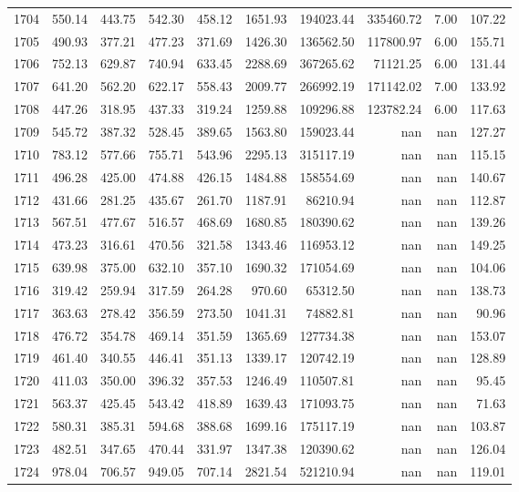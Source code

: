 \begin{tabular}{lrrrrrrrrr}
1704 & 550.14 & 443.75 & 542.30 & 458.12 & 1651.93 & 194023.44 & 335460.72 & 7.00 & 107.22 \\
1705 & 490.93 & 377.21 & 477.23 & 371.69 & 1426.30 & 136562.50 & 117800.97 & 6.00 & 155.71 \\
1706 & 752.13 & 629.87 & 740.94 & 633.45 & 2288.69 & 367265.62 & 71121.25 & 6.00 & 131.44 \\
1707 & 641.20 & 562.20 & 622.17 & 558.43 & 2009.77 & 266992.19 & 171142.02 & 7.00 & 133.92 \\
1708 & 447.26 & 318.95 & 437.33 & 319.24 & 1259.88 & 109296.88 & 123782.24 & 6.00 & 117.63 \\
1709 & 545.72 & 387.32 & 528.45 & 389.65 & 1563.80 & 159023.44 & nan & nan & 127.27 \\
1710 & 783.12 & 577.66 & 755.71 & 543.96 & 2295.13 & 315117.19 & nan & nan & 115.15 \\
1711 & 496.28 & 425.00 & 474.88 & 426.15 & 1484.88 & 158554.69 & nan & nan & 140.67 \\
1712 & 431.66 & 281.25 & 435.67 & 261.70 & 1187.91 & 86210.94 & nan & nan & 112.87 \\
1713 & 567.51 & 477.67 & 516.57 & 468.69 & 1680.85 & 180390.62 & nan & nan & 139.26 \\
1714 & 473.23 & 316.61 & 470.56 & 321.58 & 1343.46 & 116953.12 & nan & nan & 149.25 \\
1715 & 639.98 & 375.00 & 632.10 & 357.10 & 1690.32 & 171054.69 & nan & nan & 104.06 \\
1716 & 319.42 & 259.94 & 317.59 & 264.28 & 970.60 & 65312.50 & nan & nan & 138.73 \\
1717 & 363.63 & 278.42 & 356.59 & 273.50 & 1041.31 & 74882.81 & nan & nan & 90.96 \\
1718 & 476.72 & 354.78 & 469.14 & 351.59 & 1365.69 & 127734.38 & nan & nan & 153.07 \\
1719 & 461.40 & 340.55 & 446.41 & 351.13 & 1339.17 & 120742.19 & nan & nan & 128.89 \\
1720 & 411.03 & 350.00 & 396.32 & 357.53 & 1246.49 & 110507.81 & nan & nan & 95.45 \\
1721 & 563.37 & 425.45 & 543.42 & 418.89 & 1639.43 & 171093.75 & nan & nan & 71.63 \\
1722 & 580.31 & 385.31 & 594.68 & 388.68 & 1699.16 & 175117.19 & nan & nan & 103.87 \\
1723 & 482.51 & 347.65 & 470.44 & 331.97 & 1347.38 & 120390.62 & nan & nan & 126.04 \\
1724 & 978.04 & 706.57 & 949.05 & 707.14 & 2821.54 & 521210.94 & nan & nan & 119.01 \\

\end{tabular}
